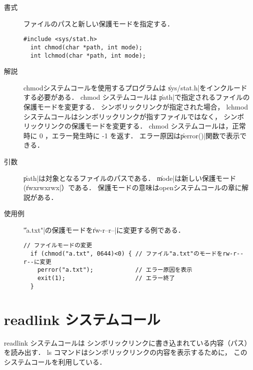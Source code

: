 \begin{description}
\item[書式] ファイルのパスと新しい保護モードを指定する．
\begin{lstlisting}[numbers=none]
  #include <sys/stat.h>
  int chmod(char *path, int mode);
  int lchmod(char *path, int mode);
\end{lstlisting}

\item[解説] chmodシステムコールを使用するプログラムは
\|sys/stat.h|をインクルードする必要がある．
chmod システムコールは
\|path|で指定されるファイルの保護モードを変更する．
シンボリックリンクが指定された場合，
lchmod システムコールはシンボリックリンクが指すファイルではなく，
シンボリックリンクの保護モードを変更する．
chmod システムコールは，正常時に 0 ，エラー発生時に -1 を返す．
エラー原因は\|perror()|関数で表示できる．

\item[引数] \|path|は対象となるファイルのパスである．
\|mode|は新しい保護モード(\|rwxrwxrwx|）である．
保護モードの意味はopenシステムコールの章に解説がある．

\item[使用例] \|"a.txt"|の保護モードを\|rw-r--r--|に変更する例である．
\begin{lstlisting}[numbers=none]
  // ファイルモードの変更
  if (chmod("a.txt", 0644)<0) { // ファイル"a.txt"のモードをrw-r--r--に変更
    perror("a.txt");            // エラー原因を表示
    exit(1);                    // エラー終了
  }
\end{lstlisting}
\end{description}

\section{readlink システムコール}

readlink システムコールは
シンボリックリンクに書き込まれている内容（パス）を読み出す．
ls コマンドはシンボリックリンクの内容を表示するために，
このシステムコールを利用している．

